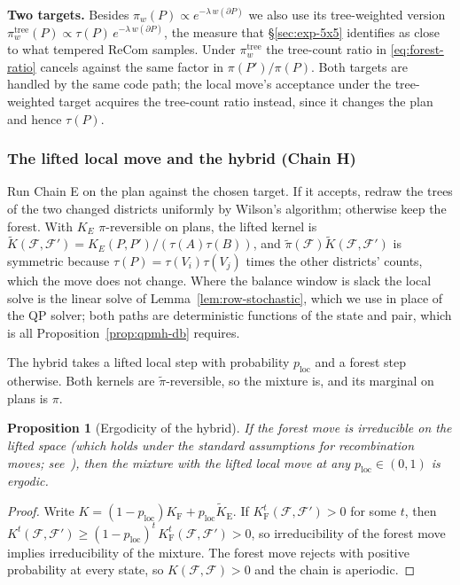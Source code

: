 \documentclass[11pt]{article}
\newtheorem{proposition}{Proposition}[section]
\begin{document}
\textbf{Two targets.} Besides $\pi_w(P) \propto e^{-\lambda\, w(\partial P)}$
we also use its tree-weighted version
$\pi_w^{\mathrm{tree}}(P) \propto \tau(P)\, e^{-\lambda\, w(\partial P)}$,
the measure that \S\ref{sec:exp-5x5} identifies as close to what
tempered ReCom samples. Under $\pi_w^{\mathrm{tree}}$ the tree-count
ratio in \eqref{eq:forest-ratio} cancels against the same factor in
$\pi(P')/\pi(P)$. Both targets are handled by the same code path; the
local move's acceptance under the tree-weighted target acquires the
tree-count ratio instead, since it changes the plan and hence
$\tau(P)$.

\subsubsection{The lifted local move and the hybrid (Chain H)}\label{sec:lifted-local}

Run Chain E on the plan against the chosen target. If it accepts,
redraw the trees of the two changed districts uniformly by Wilson's
algorithm; otherwise keep the forest. With $K_E$ $\pi$-reversible on
plans, the lifted kernel is
$\tilde K(\mathcal{F}, \mathcal{F}') = K_E(P, P') / (\tau(A)\tau(B))$,
and $\tilde\pi(\mathcal{F})\tilde K(\mathcal{F}, \mathcal{F}')$ is
symmetric because $\tau(P) = \tau(V_i)\tau(V_j)$ times the other
districts' counts, which the move does not change. Where the balance
window is slack the local solve is the linear solve of
Lemma~\ref{lem:row-stochastic}, which we use in place of the QP
solver; both paths are deterministic functions of the state and pair,
which is all Proposition~\ref{prop:qpmh-db} requires.

The hybrid takes a lifted local step with probability
$p_{\mathrm{loc}}$ and a forest step otherwise. Both kernels are
$\tilde\pi$-reversible, so the mixture is, and its marginal on plans
is $\pi$.

\begin{proposition}[Ergodicity of the hybrid]\label{prop:ergodic}
If the forest move is irreducible on the lifted space (which holds
under the standard assumptions for recombination moves;
see~\cite{deford2021recombination,cannon2024irreducibility,autry2023metropolized}),
then the mixture with the lifted local move at any
$p_{\mathrm{loc}} \in (0, 1)$ is ergodic.
\end{proposition}

\begin{proof}
Write $K = (1 - p_{\mathrm{loc}}) K_{\mathrm{F}} + p_{\mathrm{loc}}
\tilde K_{\mathrm{E}}$. If $K_{\mathrm{F}}^{t}(\mathcal{F}, \mathcal{F}') > 0$
for some $t$, then
$K^{t}(\mathcal{F}, \mathcal{F}') \ge (1 - p_{\mathrm{loc}})^{t}\,
K_{\mathrm{F}}^{t}(\mathcal{F}, \mathcal{F}') > 0$, so irreducibility
of the forest move implies irreducibility of the mixture. The forest
move rejects with positive probability at every state, so
$K(\mathcal{F}, \mathcal{F}) > 0$ and the chain is aperiodic.
\end{proof}
\end{document}
